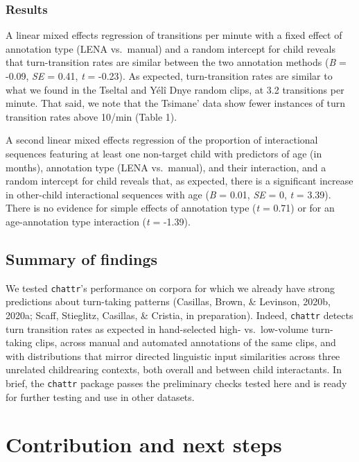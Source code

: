\documentclass[10pt, letterpaper]{article}
\begin{document}
\hypertarget{results-1}{%
\subsubsection{Results}\label{results-1}}

A linear mixed effects regression of transitions per minute with a fixed
effect of annotation type (LENA vs.~manual) and a random intercept for
child reveals that turn-transition rates are similar between the two
annotation methods (\emph{B} = -0.09, \emph{SE} = 0.41, \emph{t} =
-0.23). As expected, turn-transition rates are similar to what we found
in the Tseltal and Yélî Dnye random clips, at 3.2 transitions per
minute. That said, we note that the Tsimane' data show fewer instances
of turn transition rates above 10/min (Table 1).

A second linear mixed effects regression of the proportion of
interactional sequences featuring at least one non-target child with
predictors of age (in months), annotation type (LENA vs.~manual), and
their interaction, and a random intercept for child reveals that, as
expected, there is a significant increase in other-child interactional
sequences with age (\emph{B} = 0.01, \emph{SE} = 0, \emph{t} = 3.39).
There is no evidence for simple effects of annotation type (\emph{t} =
0.71) or for an age-annotation type interaction (\emph{t} = -1.39).

\hypertarget{summary-of-findings}{%
\subsection{Summary of findings}\label{summary-of-findings}}

We tested \texttt{chattr}'s performance on corpora for which we already
have strong predictions about turn-taking patterns (Casillas, Brown, \&
Levinson, 2020b, 2020a; Scaff, Stieglitz, Casillas, \& Cristia, in
preparation). Indeed, \texttt{chattr} detects turn transition rates as
expected in hand-selected high- vs.~low-volume turn-taking clips, across
manual and automated annotations of the same clips, and with
distributions that mirror directed linguistic input similarities across
three unrelated childrearing contexts, both overall and between child
interactants. In brief, the \texttt{chattr} package passes the
preliminary checks tested here and is ready for further testing and use
in other datasets.

\hypertarget{contribution-and-next-steps}{%
\section{Contribution and next
steps}\label{contribution-and-next-steps}}
\end{document}
